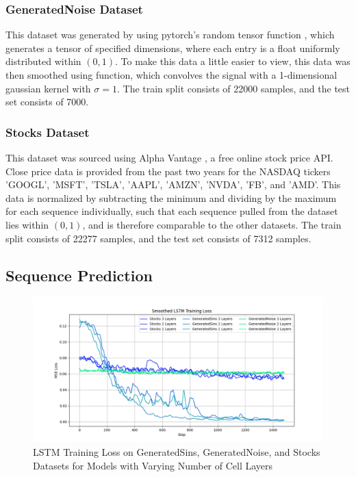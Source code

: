 \documentclass{scrartcl}
\begin{document}
\subsubsection{GeneratedNoise Dataset}
\label{subsubsec:generatednoise_intro}

This dataset was generated by using pytorch's random tensor function
, which generates a tensor of specified dimensions,
where each entry is a float uniformly distributed within $(0, 1)$. To make this
data a little easier to view, this data was then smoothed using
 function, which convolves
the signal with a 1-dimensional gaussian kernel with $\sigma = 1$. The train
split consists of 22000 samples, and the test set consists of 7000.

\subsubsection{Stocks Dataset}
\label{subsubsec:stocks_intro}

This dataset was sourced using Alpha Vantage \cite{alpha_vantage}, a free
online stock price API. Close price data is provided from the past two years
for the NASDAQ tickers 'GOOGL', 'MSFT', 'TSLA', 'AAPL', 'AMZN', 'NVDA', 'FB',
and 'AMD'. This data is normalized by subtracting the minimum and dividing by
the maximum for each sequence individually, such that each sequence pulled from
the dataset lies within $(0, 1)$, and is therefore comparable to the other
datasets. The train split consists of 22277 samples, and the test set consists
of 7312 samples.

\subsection{Sequence Prediction}
\label{subsec:experiment_sp}

\begin{figure}[H]
	\begin{center}
		\includegraphics[width=1\textwidth]{plots/lstm_train_loss.png}
	\end{center}
	\caption{LSTM Training Loss on GeneratedSins, GeneratedNoise, and Stocks \\
	Datasets for Models with Varying Number of Cell Layers}
	\label{plt:lstm_train_loss}
\end{figure}
\end{document}
